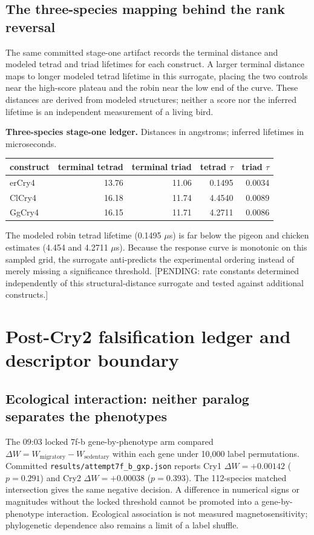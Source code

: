 \subsection{The three-species mapping behind the rank reversal}
The same committed stage-one artifact records the terminal distance and modeled tetrad and triad lifetimes for each construct. A larger terminal distance maps to longer modeled tetrad lifetime in this surrogate, placing the two controls near the high-score plateau and the robin near the low end of the curve. These distances are derived from modeled structures; neither a score nor the inferred lifetime is an independent measurement of a living bird.\par\medskip\noindent\textbf{Three-species stage-one ledger.} Distances in angstroms; inferred lifetimes in microseconds.
\begin{center}\small\begin{tabular}{lrrrr}\hline construct & terminal tetrad & terminal triad & tetrad $\tau$ & triad $\tau$ \\\hline
erCry4 & 13.76 & 11.06 & 0.1495 & 0.0034 \\
ClCry4 & 16.18 & 11.74 & 4.4540 & 0.0089 \\
GgCry4 & 16.15 & 11.71 & 4.2711 & 0.0086 \\
\hline\end{tabular}\end{center}
The modeled robin tetrad lifetime (0.1495 $\mu$s) is far below the pigeon and chicken estimates (4.454 and 4.2711 $\mu$s). Because the response curve is monotonic on this sampled grid, the surrogate anti-predicts the experimental ordering instead of merely missing a significance threshold. [PENDING: rate constants determined independently of this structural-distance surrogate and tested against additional constructs.]



\section{Post-Cry2 falsification ledger and descriptor boundary}
\subsection{Ecological interaction: neither paralog separates the phenotypes}
The 09:03 locked 7f-b gene-by-phenotype arm compared $\Delta W=W_{\mathrm{migratory}}-W_{\mathrm{sedentary}}$ within each gene under 10,000 label permutations. Committed \texttt{results/attempt7f\_b\_gxp.json} reports Cry1 $\Delta W=+0.00142$ ($p=0.291$) and Cry2 $\Delta W=+0.00038$ ($p=0.393$). The 112-species matched intersection gives the same negative decision. A difference in numerical signs or magnitudes without the locked threshold cannot be promoted into a gene-by-phenotype interaction. Ecological association is not measured magnetosensitivity; phylogenetic dependence also remains a limit of a label shuffle.

